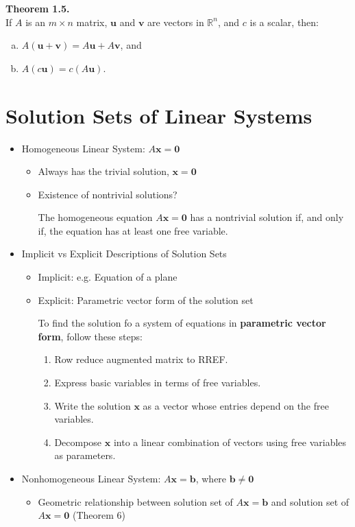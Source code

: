 \documentclass[10pt]{book}
\newenvironment{boxthm}{\begin{mdframed}[backgroundcolor=gray!30,nobreak=true]}{\end{mdframed}}
\newenvironment{boxdef}{\begin{mdframed}[backgroundcolor=gray!30,linewidth=0pt,nobreak=true]}{\end{mdframed}}
\newcommand{\R}{\mathbb{R}}
\newcommand{\vect}[1]{\ensuremath{\boldsymbol{\mathbf{#1}}}}
\begin{document}
\begin{boxthm}
	\textbf{Theorem 1.5.} \\
	If $A$ is an $m\times n$ matrix, $\vect{u}$ and $\vect{v}$ are vectors in $\R^n$, and $c$ is a scalar, then:
	\begin{enumerate}[(a)]\itemsep0em 
		\item $A(\vect{u}+\vect{v}) = A\vect{u} + A\vect{v}$, and
		\item $A(c\vect{u}) = c(A\vect{u})$.
	\end{enumerate}
\end{boxthm}


\section{Solution Sets of Linear Systems}
\begin{itemize}
	\item Homogeneous Linear System: $A\vect{x}=\vect{0}$
		\begin{itemize}
			\item Always has the trivial solution, $\vect{x}=\vect{0}$
			\item Existence of nontrivial solutions?
			\begin{boxdef}
				The homogeneous equation $A\vect{x}=\vect{0}$ has a nontrivial solution if, and only if, the equation has at least one free variable.
			\end{boxdef}
		\end{itemize}
	\item Implicit vs Explicit Descriptions of Solution Sets
		\begin{itemize}
			\item Implicit: e.g. Equation of a plane
			\item Explicit: Parametric vector form of the solution set
				\begin{boxdef}
					To find the solution fo a system of equations in \textbf{parametric vector form}, follow these steps:
					\begin{enumerate}
						\item Row reduce augmented matrix to RREF.
						\item Express basic variables in terms of free variables.
						\item Write the solution $\vect{x}$ as a vector whose entries depend on the free variables.
						\item Decompose $\vect{x}$ into a linear combination of vectors using free variables as parameters.
					\end{enumerate}
				\end{boxdef}
		\end{itemize}
	\item Nonhomogeneous Linear System: $A\vect{x}=\vect{b}$, where $\vect{b}\neq\vect{0}$
		\begin{itemize}
			\item Geometric relationship between solution set of $A\vect{x}=\vect{b}$ and solution set of $A\vect{x}=\vect{0}$ (Theorem 6)
		\end{itemize}
\end{itemize}
\end{document}
